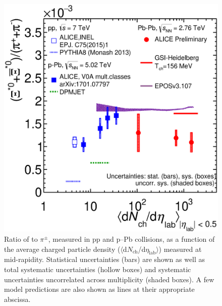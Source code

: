 \begin{figure}[htbp]
\begin{center}
\includegraphics[width=10.cm]{./Version1/FigChapter6/Ratio/Ratio_XiStarToPion}
\caption{Ratio of \xis to $\pi^{\pm}$, measured in pp \cite{cite:pp7_piKp} and p--Pb \cite{cite:Xi_pp} collisions, as a function of the average charged particle 
 density ($\langle$d$N_{\mathrm{ch}}$/d$\eta_{\mathrm{lab}}\rangle$) measured at mid-rapidity. Statistical uncertainties (bars) are shown as well as total systematic uncertainties (hollow boxes) and systematic uncertainties uncorrelated across multiplicity (shaded boxes). A few model predictions are also shown as lines at their appropriate abscissa.}
\label{fig:xitopi}
\end{center}
\end{figure}

